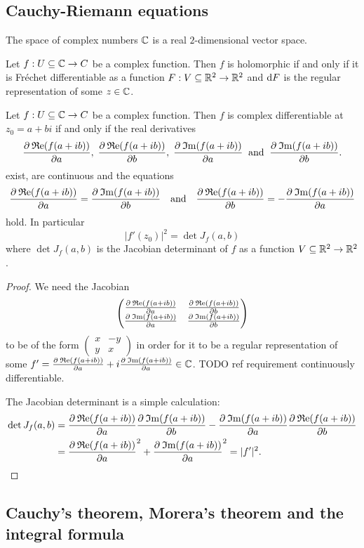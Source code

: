 \subsection{Cauchy-Riemann equations}
The space of complex numbers $\C$ is a real $2$-dimensional vector space.

\begin{lemma}
Let $f: U\subseteq \C \to C$ be a complex function. Then $f$ is holomorphic \textup{if and only if} it is Fréchet differentiable as a function $F: V\subseteq \R^2 \to \R^2$ and $\diff F$ is the regular representation of some $z\in \C$.
\end{lemma}
\begin{corollary}
Let $f: U\subseteq \C \to C$ be a complex function. Then $f$ is complex differentiable at $z_0 = a+bi$ \textup{if and only if} the real derivatives
\[ \pd{\Re(f(a + ib))}{a},\; \pd{\Re(f(a + ib))}{b},\;
\pd{\Im(f(a + ib))}{a} \;\;\text{and}\;\; \pd{\Im(f(a + ib))}{b}. \]
exist, are continuous and the equations
\[
\pd{\Re(f(a + ib))}{a} = \pd{\Im(f(a + ib))}{b} \quad\text{and}\quad \pd{\Re(f(a + ib))}{b} = -\pd{\Im(f(a + ib))}{a} \]
hold. In particular
\[ |f'(z_0)|^2 = \det J_f(a,b) \]
where $\det J_f(a,b)$ is the Jacobian determinant of $f$ as a function $V\subseteq \R^2 \to \R^2$.
\end{corollary}
\begin{proof}
We need the Jacobian
\[ \begin{pmatrix}
\pd{\Re(f(a + ib))}{a} & \pd{\Re(f(a + ib))}{b} \\
\pd{\Im(f(a + ib))}{a} & \pd{\Im(f(a + ib))}{b}
\end{pmatrix} \]
to be of the form $\begin{pmatrix}
x & -y \\ y & x
\end{pmatrix}$ in order for it to be a regular representation of some $f' =\pd{\Re(f(a + ib))}{a} + i\pd{\Im(f(a + ib))}{a} \in \C$. TODO ref requirement continuously differentiable.

The Jacobian determinant is a simple calculation:
\begin{align*}
\det J_f(a,b) &= \pd{\Re(f(a + ib))}{a}\pd{\Im(f(a + ib))}{b} - \pd{\Im(f(a + ib))}{a}\pd{\Re(f(a + ib))}{b} \\
&= \pd{\Re(f(a + ib))}{a}^2 + \pd{\Im(f(a + ib))}{a}^2 = |f'|^2.
\end{align*}
\end{proof}

\subsection{Cauchy's theorem, Morera's theorem and the integral formula}

